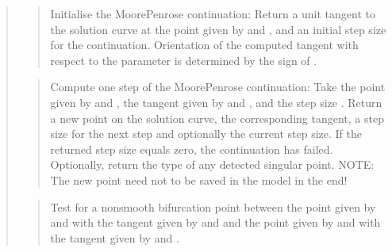 \documentclass[a4paper,11pt,english]{sphinxmanual}
\begin{document}
\begin{quote}
\sphinxAtStartPar
{}
\begin{quote}

\sphinxAtStartPar
Initialise the Moore\sphinxhyphen{}Penrose continuation: Return a unit tangent to
the solution curve at the point given by  and ,
and an initial step size for the continuation. Orientation of the
computed tangent with respect to the parameter is determined by the
sign of .
\end{quote}

\sphinxAtStartPar
{}
\begin{quote}

\sphinxAtStartPar
Compute one step of the Moore\sphinxhyphen{}Penrose continuation: Take the point
given by  and , the tangent given by 
and , and the step size . Return a new point on the
solution curve, the corresponding tangent, a step size for the next
step and optionally the current step size. If the returned step
size equals zero, the continuation has failed. Optionally, return
the type of any detected singular point.
NOTE: The new point need not to be saved in the model in the end!
\end{quote}

\sphinxAtStartPar
{}
\begin{quote}

\sphinxAtStartPar
Test for a non\sphinxhyphen{}smooth bifurcation point between the point given by
 and  with the tangent given by 
and  and the point given by  and 
with the tangent given by  and .
\end{quote}


\end{quote}
\end{document}
